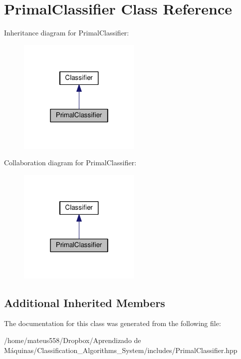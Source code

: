 \hypertarget{class_primal_classifier}{}\section{Primal\+Classifier Class Reference}
\label{class_primal_classifier}


Inheritance diagram for Primal\+Classifier\+:\nopagebreak
\begin{figure}[H]
\begin{center}
\leavevmode
\includegraphics[width=166pt]{class_primal_classifier__inherit__graph}
\end{center}
\end{figure}


Collaboration diagram for Primal\+Classifier\+:\nopagebreak
\begin{figure}[H]
\begin{center}
\leavevmode
\includegraphics[width=166pt]{class_primal_classifier__coll__graph}
\end{center}
\end{figure}
\subsection*{Additional Inherited Members}


The documentation for this class was generated from the following file\+:\begin{DoxyCompactItemize}
\item 
/home/mateus558/\+Dropbox/\+Aprendizado de Máquinas/\+Classification\+\_\+\+Algorithms\+\_\+\+System/includes/Primal\+Classifier.\+hpp\end{DoxyCompactItemize}
